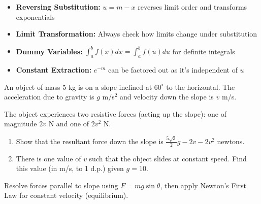 \begin{takeaways}
\begin{itemize}
\item \textbf{Reversing Substitution:} $u = m - x$ reverses limit order and transforms exponentials
\item \textbf{Limit Transformation:} Always check how limits change under substitution
\item \textbf{Dummy Variables:} $\int_a^b f(x)dx = \int_a^b f(u)du$ for definite integrals
\item \textbf{Constant Extraction:} $e^{-m}$ can be factored out as it's independent of $u$
\end{itemize}
\end{takeaways}

\vspace{1.5cm}


\begin{problem}
An object of mass $5$ kg is on a slope inclined at $60^\circ$ to the horizontal. The acceleration due to gravity is $g$ m/s$^2$ and velocity down the slope is $v$ m/s.

The object experiences two resistive forces (acting up the slope): one of magnitude $2v$ N and one of $2v^2$ N.

\begin{enumerate}[label=(\roman*)]
\item Show that the resultant force down the slope is $\frac{5\sqrt{3}}{2}g - 2v - 2v^2$ newtons.
\item There is one value of $v$ such that the object slides at constant speed. Find this value (in m/s, to 1 d.p.) given $g = 10$.
\end{enumerate}
\end{problem}

\begin{hint}
Resolve forces parallel to slope using $F = mg\sin\theta$, then apply Newton's First Law for constant velocity (equilibrium).
\end{hint}


